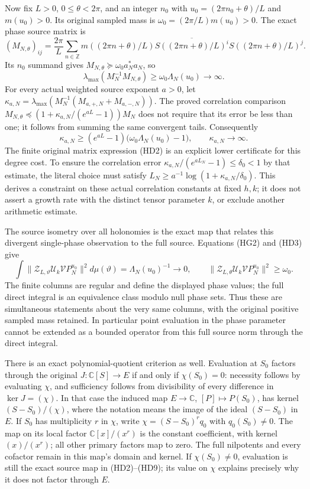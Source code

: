 \documentclass{article}
\begin{document}
Now fix $L>0$, $0\le\theta<2\pi$, and an integer $n_0$ with
$u_0=(2\pi n_0+\theta)/L$ and $m(u_0)>0$. Its original sampled mass is
$\omega_0=(2\pi/L)m(u_0)>0$. The exact phase source matrix is
\[
 (M_{N,\theta})_{ij}=\frac{2\pi}{L}
 \sum_{n\in\mathbb Z}m((2\pi n+\theta)/L)
 \overline{S((2\pi n+\theta)/L)^i}
 S((2\pi n+\theta)/L)^j .
 \tag{HD6}
\]
Its $n_0$ summand gives
$M_{N,\theta}\succeq\omega_0 a_N^*a_N$, so
\[
 \lambda_{\max}(M_N^{-1}M_{N,\theta})
 \ge\omega_0\Lambda_N(u_0)\longrightarrow\infty .
 \tag{HD7}
\]
For every actual weighted source exponent $a>0$, let
$\kappa_{a,N}=\lambda_{\max}
(M_N^{-1}(M_{a,+,N}+M_{a,-,N}))$.
The proved correlation comparison
$M_{N,\theta}\preceq
(1+\kappa_{a,N}/(e^{aL}-1))M_N$ does not require that its error be
less than one; it follows from summing the same convergent tails.
Consequently
\[
 \boxed{\kappa_{a,N}\ge
 (e^{aL}-1)\bigl(\omega_0\Lambda_N(u_0)-1\bigr),\qquad
 \kappa_{a,N}\longrightarrow\infty .}
 \tag{HD8}
\]
The finite original matrix expression (HD2) is an explicit lower
certificate for this degree cost. To ensure the correlation error
$\kappa_{a,N}/(e^{aL_N}-1)\le\delta_0<1$ by that estimate, the
literal choice must satisfy
$L_N\ge a^{-1}\log(1+\kappa_{a,N}/\delta_0)$.
This derives a constraint on these actual correlation constants at fixed
$h,k$; it does not assert a growth rate with the distinct tensor
parameter $k$, or exclude another arithmetic estimate.

The source isometry over all holonomies is the exact map that relates
this divergent single-phase observation to the full source. Equations
(HG2) and (HD3) give
\[
 \int\|\mathcal Z_{L,\vartheta}\mathcal U_k
               \mathcal V P_N^{u_0}\|^2d\mu(\vartheta)
 =\Lambda_N(u_0)^{-1}\longrightarrow0,
 \qquad
 \|\mathcal Z_{L,\theta}\mathcal U_k
               \mathcal V P_N^{u_0}\|^2\ge\omega_0 .
 \tag{HD9}
\]
The finite columns are regular and define the displayed phase values;
the full direct integral is an equivalence class modulo null phase
sets. Thus these are simultaneous statements about the very same
columns, with the original positive sampled mass retained. In particular
point evaluation in the phase parameter cannot be extended as a bounded
operator from this full source norm through the direct integral.

There is an exact polynomial-quotient criterion as well. Evaluation at
$S_0$ factors through the original $J:\mathbb C[S]\to E$ if and
only if $\chi(S_0)=0$: necessity follows by evaluating $\chi$,
and sufficiency follows from divisibility of every difference in
$\ker J=(\chi)$. In that case the induced map
$E\to\mathbb C$, $[P]\mapsto P(S_0)$, has kernel
$(S-S_0)/(\chi)$, where the notation means the image of the ideal
$(S-S_0)$ in $E$. If $S_0$ has multiplicity $r$ in $\chi$, write
$\chi=(S-S_0)^r q_0$ with $q_0(S_0)\ne0$. The map on its local
factor $\mathbb C[x]/(x^r)$ is the constant coefficient, with kernel
$(x)/(x^r)$; all other primary factors map to zero. The full
nilpotents and every cofactor remain in this map's domain and kernel.
If $\chi(S_0)\ne0$, evaluation is still the exact source map in
(HD2)--(HD9); its value on $\chi$ explains precisely why it does not
factor through $E$.
\end{document}
